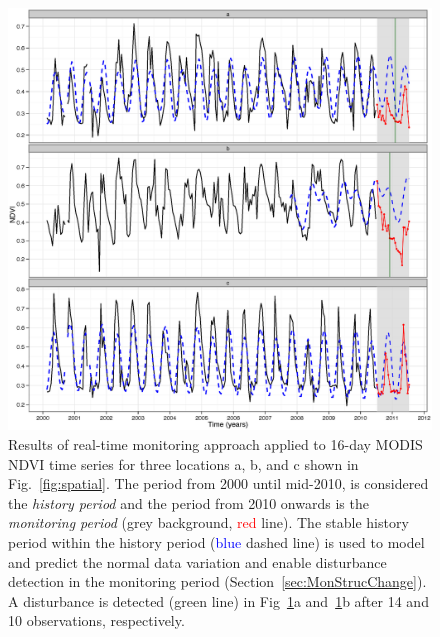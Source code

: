 \documentclass[authoryear,preprint,review,10pt]{elsarticle}
\begin{document}
\begin{figure}[htp]
\centering
    \includegraphics[width=1\textwidth]{figs/Fig6_tsexampleSOM.eps}
  \caption{
 Results of real-time monitoring approach applied to 16-day MODIS NDVI time series for three locations a, b, and c shown in Fig.~\ref{fig:spatial}. The period from 2000 until mid-2010, is considered the \emph{history period} and the period from 2010 onwards is the \emph{monitoring period} (grey background, \textcolor{red} {red} line). The stable history period within the history period (\textcolor{blue} {blue} dashed line) is used to model and predict the normal data variation and enable disturbance detection in the monitoring period (Section~\ref{sec:MonStrucChange}).  A disturbance is detected (\textcolor{OliveGreen} {green} line) in Fig~\ref{fig:realmon}a and~\ref{fig:realmon}b after 14 and 10 observations, respectively.}
  \label{fig:realmon}
\end{figure}
 
\end{document}
